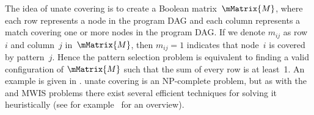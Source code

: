 The idea of \gls{unate covering} is to create a Boolean matrix~$\mMatrix{M}$,
where each row represents a \gls{node} in the \gls{program DAG} and each column
represents a \gls{match} covering one or more \glspl{node} in the \gls{program
  DAG}.
%
If we denote $m_{ij}$ as row~$i$ and column~$j$ in~$\mMatrix{M}$, then
\mbox{$m_{ij} = 1$} indicates that \gls{node}~$i$ is covered by
\gls{pattern}~$j$.
%
Hence the \gls{pattern selection} problem is equivalent to
finding a valid configuration of $\mMatrix{M}$ such that the sum of every row is
at least~1.
%
An example is given in
.
%
\Gls{unate covering} is an NP-complete
problem, but as with the  and \glspl{MWIS problem} there
exist several efficient techniques for solving it heuristically (see for
example~\cite{Cordone2000, Goldberg2006} for an overview).

%
%

